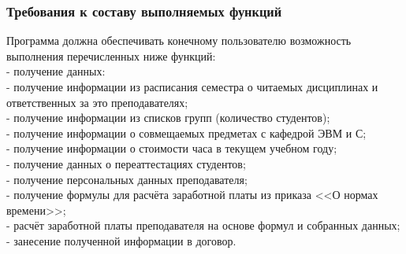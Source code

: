 \documentclass[14pt]{extarticle}
\begin{document}
        \subsubsection{Требования к составу выполняемых функций}
        Программа должна обеспечивать конечному пользователю возможность выполнения перечисленных ниже функций:\\
        - получение данных:\\
            \hspace*{3em} - получение информации из расписания семестра о читаемых дисциплинах и ответственных за это преподавателях;\\
            \hspace*{3em} - получение информации из списков групп (количество студентов);\\
            \hspace*{3em} - получение информации о совмещаемых предметах с кафедрой ЭВМ и С;\\
            \hspace*{3em} - получение информации о стоимости часа в текущем учебном году;\\
            \hspace*{3em} - получение данных о переаттестациях студентов;\\
            \hspace*{3em} - получение персональных данных преподавателя;\\
            \hspace*{3em} - получение формулы для расчёта заработной платы из приказа <<О нормах времени>>;\\
        - расчёт заработной платы преподавателя на основе формул и собранных данных;\\
        - занесение полученной информации в договор.\\
       
\end{document}
